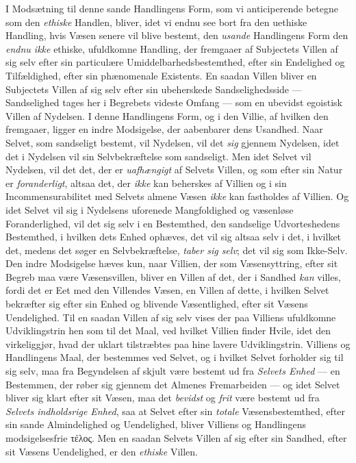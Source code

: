I Modsætning til denne sande Handlingens Form, som vi anticiperende betegne som
den \emph{ethiske} Handlen, bliver, idet vi endnu see bort fra den uethiske
Handling, hvis Væsen senere vil blive bestemt, den \emph{usande} Handlingens
Form den \emph{endnu ikke} ethiske, ufuldkomne Handling, der fremgaaer af
Subjectets Villen af sig selv efter sin particulære Umiddelbarhedsbestemthed,
efter sin Endelighed og Tilfældighed, efter sin phænomenale Existents. En saadan
Villen bliver en Subjectets Villen af sig selv efter sin ubeherskede
Sandselighedsside --- Sandselighed tages her i Begrebets videste Omfang --- som
en ubevidst egoistisk Villen af Nydelsen. I denne Handlingens Form, og i den
Villie, af hvilken den fremgaaer, ligger en indre Modsigelse, der aabenbarer
dens Usandhed. Naar Selvet, som sandseligt bestemt, vil Nydelsen, vil det
\emph{sig} gjennem Nydelsen, idet det i Nydelsen vil sin Selvbekræftelse som
sandseligt. Men idet Selvet vil Nydelsen, vil det det, der er
\emph{uafhængigt} af Selvets Villen, og som efter sin Natur er
\emph{foranderligt}, altsaa det, der \emph{ikke} kan beherskes af Villien og i
sin Incommensurabilitet med Selvets almene Væsen \emph{ikke} kan fastholdes af
Villien. Og idet Selvet vil sig i Nydelsens uforenede Mangfoldighed og væsenløse
Foranderlighed, vil det sig selv i en Bestemthed, den sandselige Udvorteshedens
Bestemthed, i hvilken dets Enhed ophæves, det vil sig altsaa selv i det, i
hvilket det, medens det søger en Selvbekræftelse, \emph{taber sig selv}; det vil
sig som Ikke-Selv. Den indre Modsigelse hæves kun, naar Villien, der som
Væsensyttring, efter sit Begreb maa være Væsensvillen, bliver en Villen af det,
der i Sandhed \emph{kan} villes, fordi det er Eet med den Villendes Væsen, en
Villen af dette, i hvilken Selvet bekræfter sig efter sin Enhed og blivende
Væsentlighed, efter sit Væsens Uendelighed. Til en saadan Villen af sig selv
 vises der paa Villiens ufuldkomne Udviklingstrin hen som til det Maal, ved
hvilket Villien finder Hvile, idet den virkeliggjør, hvad der uklart tilstræbtes
paa hine lavere Udviklingstrin. Villiens og Handlingens Maal, der bestemmes ved
Selvet, og i hvilket Selvet forholder sig til sig selv, maa fra Begyndelsen af
skjult være bestemt ud fra \emph{Selvets Enhed} --- en Bestemmen, der røber sig
gjennem det Almenes Fremarbeiden --- og idet Selvet bliver sig klart efter sit
Væsen, maa det \emph{bevidst} og \emph{frit} være bestemt ud fra \emph{Selvets
indholdsrige Enhed}, saa at Selvet efter sin \emph{totale} Væsensbestemthed,
efter sin sande Almindelighed og Uendelighed, bliver Villiens og Handlingens
modsigelsesfrie τέλος. Men en saadan Selvets Villen af sig efter sin Sandhed,
efter sit Væsens Uendelighed, er den \emph{ethiske} Villen.

